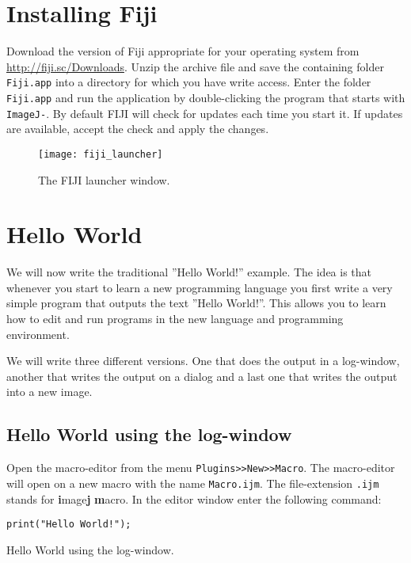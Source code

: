 \section{Installing Fiji}

Download the version of Fiji appropriate for your operating system from \url{http://fiji.sc/Downloads}. Unzip the archive file and save the containing folder {\tt Fiji.app} into a directory for which you have write access. Enter the folder {\tt Fiji.app} and run the application by double-clicking the program that starts with {\tt ImageJ-}. By default FIJI will check for updates each time you start it. If updates are available, accept the check and apply the changes.

\begin{figure}[h!]
  \centering
    \texttt{[image: fiji\_launcher]}
    \caption[The FIJI launcher window]{The FIJI launcher window.}
    \label{fiji_launcher}
\end{figure}

\section{Hello World}

We will now write the traditional ''Hello World!'' example. The idea is that whenever you start to learn a new programming language you first write a very simple program that outputs the text ''Hello World!''. This allows you to learn how to edit and run programs in the new language and programming environment.

We will write three different versions. One that does the output in a log-window, another that writes the output on a dialog and a last one that writes the output into a new image.

\subsection{Hello World using the log-window}

Open the macro-editor from the menu {\tt Plugins>>New>>Macro}. The macro-editor will open on a new macro with the name {\tt Macro.ijm}. The file-extension {\tt .ijm} stands for \textbf{i}mage\textbf{j} \textbf{m}acro. In the editor window enter the following command:

\begin{listing}[H]
\begin{verbatim}
print("Hello World!");
\end{verbatim}
\caption{Hello World using the log-window.}
\label{lst:hello_world_log_window}
\end{listing}
 
